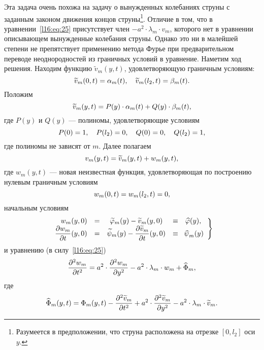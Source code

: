 Эта задача очень похожа на задачу о вынужденных колебаниях струны с заданным законом движения концов струны\footnote{Разумеется в предположении, что струна расположена на отрезке $[0,l_2]$ оси $y$.}. Отличие в том, что в уравнении~\eqref{l16:eq:25} присутствует член $-a^2\cdot\lambda_m\cdot v_m$, которого нет в уравнении описывающем вынужденные колебания струны. Однако это ни в малейшей степени не препятствует применению метода Фурье при предварительном переводе неоднородностей из граничных условий в уравнение. Наметим ход решения. Находим функцию $\widetilde{v}_m(y,t)$, удовлетворяющую граничным условиям: 
\begin{equation*}
	\hfill\widetilde{v}_m(0,t)=\alpha_m(t),\quad\widetilde{v}_m(l_2,t)=\beta_m(t).\hfill
\end{equation*}  
Положим
\begin{equation*}
	\hfill \widetilde{v}_m(y,t)=P(y)\cdot\alpha_m(t)+Q(y)\cdot\beta_m(t),\hfill
\end{equation*}
где $P(y)$ и $Q(y)$ --- полиномы, удовлетворяющие условиям 
\begin{equation*}
	\hfill P(0)=1,\quad P(l_2)=0,\quad Q(0)=0,\quad Q(l_2)=1,\hfill
\end{equation*}
где полиномы не зависят от $m$. Далее полагаем 
\begin{equation*}
	\hfill v_m(y,t)=\widetilde{v}_m(y,t)+w_m(y,t),\hfill
\end{equation*}
где $w_m(y,t)$ --- новая неизвестная функция, удовлетворяющая по построению нулевым граничным условиям
\begin{equation}\label{l16:eq:28}
	\hfill w_m(0,t)=w_m(l_2,t)=0,\hfill
\end{equation}
начальным условиям 
\begin{equation}\label{l16:eq:29}
	\hfill\left.\begin{array}{rcccl}
		w_m(y,0)&=&\widetilde{\phi}_m(y)-\widetilde{v}_m(y,0)&\equiv&\widehat{\phi}(y),\\
		\displaystyle \pder{w_m}{t}(y,0)&=&\displaystyle\widetilde{\psi}_m(y)-\pder{\widetilde{v}_m}{t}(y,0)&\equiv&\psihat_m(y)
	\end{array}\right\}\hfill
\end{equation}
и уравнению (в силу~\eqref{l16:eq:25})
\begin{equation}\label{l16:eq:30}
	\hfill\pdder{w_m}{t}=a^2\cdot\pdder{w_m}{y}-a^2\cdot\lambda_m\cdot w_m+\widehat{\Phi}_m,\hfill
\end{equation}
где 
\begin{equation*}
	\hfill\widehat{\Phi}_m(y,t)=\Phi_m(y,t)-\pdder{\widetilde{v}_m}{t}+a^2\cdot\pdder{\widetilde{v}_m}{y}-a^2\cdot\lambda_m\cdot \widetilde{v}_m.\hfill
\end{equation*}

